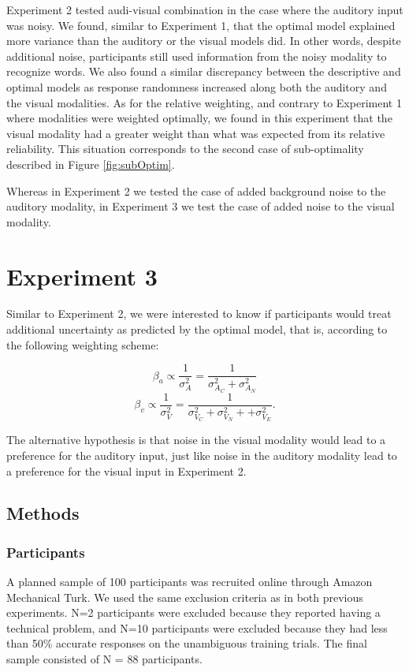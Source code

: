 \documentclass[english,,man,floatsintext]{apa6}
\theoremstyle{definition}
\theoremstyle{definition}
\theoremstyle{definition}
\theoremstyle{remark}
\begin{document}
Experiment 2 tested audi-visual combination in the case where the
auditory input was noisy. We found, similar to Experiment 1, that the
optimal model explained more variance than the auditory or the visual
models did. In other words, despite additional noise, participants still
used information from the noisy modality to recognize words. We also
found a similar discrepancy between the descriptive and optimal models
as response randomness increased along both the auditory and the visual
modalities. As for the relative weighting, and contrary to Experiment 1
where modalities were weighted optimally, we found in this experiment
that the visual modality had a greater weight than what was expected
from its relative reliability. This situation corresponds to the second
case of sub-optimality described in Figure \ref{fig:subOptim}.

Whereas in Experiment 2 we tested the case of added background noise to
the auditory modality, in Experiment 3 we test the case of added noise
to the visual modality.

\section{Experiment 3}\label{experiment-3}

Similar to Experiment 2, we were interested to know if participants
would treat additional uncertainty as predicted by the optimal model,
that is, according to the following weighting scheme:

\[\beta_a \propto \frac{1}{\sigma^2_{A}} = \frac{1}{\sigma^2_{A_C}+\sigma^2_{A_N}}\]
\[\beta_v \propto \frac{1}{\sigma^2_{V}} = \frac{1}{\sigma^2_{V_C}+\sigma^2_{V_N} + + \sigma^2_{V_E}}.\]

The alternative hypothesis is that noise in the visual modality would
lead to a preference for the auditory input, just like noise in the
auditory modality lead to a preference for the visual input in
Experiment 2.

\subsection{Methods}\label{methods-2}

\subsubsection{Participants}\label{participants-2}

A planned sample of 100 participants was recruited online through Amazon
Mechanical Turk. We used the same exclusion criteria as in both previous
experiments. N=2 participants were excluded because they reported having
a technical problem, and N=10 participants were excluded because they
had less than 50\% accurate responses on the unambiguous training
trials. The final sample consisted of N = 88 participants.
\end{document}
